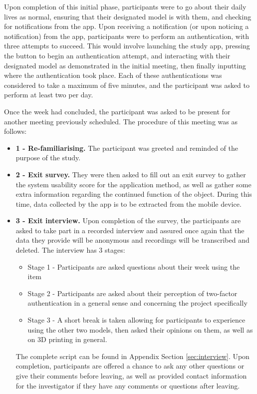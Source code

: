 \documentclass{l4proj}
\begin{document}
Upon completion of this initial phase, participants were to go about their daily lives as normal, ensuring that their designated model is with them, and checking for notifications from the app. Upon receiving a notification (or upon noticing a notification) from the app, participants were to perform an authentication, with three attempts to succeed. This would involve launching the study app, pressing the button to begin an authentication attempt, and interacting with their designated model as demonstrated in the initial meeting, then finally inputting where the authentication took place. Each of these authentications was considered to take a maximum of five minutes, and the participant was asked to perform at least two per day. 

Once the week had concluded, the participant was asked to be present for another meeting previously scheduled. The procedure of this meeting was as follows:
\begin{itemize}
    \item \textbf{1 - Re-familiarising.} The participant was greeted and reminded of the purpose of the study.
    \item \textbf{2 - Exit survey.} They were then asked to fill out an exit survey to gather the system usability score for the application method, as well as gather some extra information regarding the continued function of the object. During this time, data collected by the app is to be extracted from the mobile device.
    \item \textbf{3 - Exit interview.} Upon completion of the survey, the participants are asked to take part in a recorded interview and assured once again that the data they provide will be anonymous and recordings will be transcribed and deleted. The interview has 3 stages:
    \begin{itemize}
        \item Stage 1 - Participants are asked questions about their week using the item
        \item Stage 2 - Participants are asked about their perception of two-factor authentication in a general sense and concerning the project specifically
        \item Stage 3 - A short break is taken allowing for participants to experience using the other two models, then asked their opinions on them, as well as on 3D printing in general.
    \end{itemize}
    The complete script can be found in Appendix Section \ref{sec:interview}. Upon completion, participants are offered a chance to ask any other questions or give their comments before leaving, as well as provided contact information for the investigator if they have any comments or questions after leaving.
\end{itemize}
\end{document}
